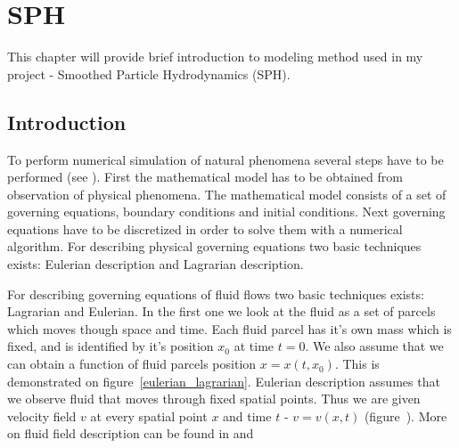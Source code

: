

\chapter{SPH}


\graphicspath{{sph/figures/}}

This chapter will provide brief introduction to modeling method used in my project - Smoothed Particle Hydrodynamics (SPH).

\section{Introduction}
To perform numerical simulation of natural phenomena several steps have to be performed (see \cite[section 1.1.2]{Liu}). First the mathematical model has to be obtained from observation of physical phenomena. The mathematical model consists of a set of governing equations, boundary conditions and initial conditions. Next governing equations have to be discretized in order to solve them with a numerical algorithm.
For describing physical governing equations two basic techniques exists: Eulerian description and Lagrarian description.

For describing governing equations of fluid flows two basic techniques exists: Lagrarian and Eulerian. In the first one we look at the fluid as a set of parcels which moves though space and time. Each fluid parcel has it's own mass which is fixed, and is identified by it's position $x_0$ at time $t = 0$. We also assume that we can obtain a function of fluid parcels position $x = x(t, x_0)$. This is demonstrated on figure~\ref{eulerian_lagrarian}.
Eulerian description assumes that we observe fluid that moves through fixed spatial points. Thus we are given velocity field $v$ at every spatial point $x$ and time $t$ - $v = v(x, t)$ (figure~\cite{eulerian_lagrarian}). 
More on fluid field description can be found in \cite[section 2.1]{Hauke2008} and \cite{Price06}


